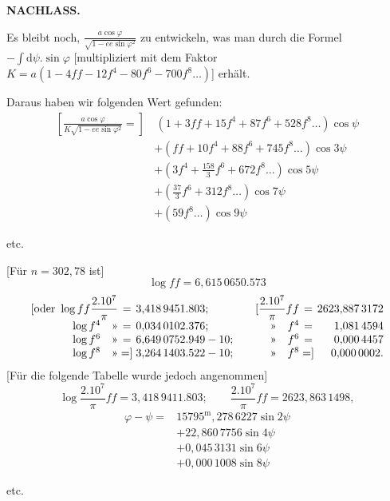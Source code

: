 \par\clearpage
{}\hfill{\small\textbf{NACHLASS.}}\hfill\null\par\medskip
Es bleibt noch, \(\frac{a\cos\varphi}{\sqrt{1-ee\sin\varphi^2}}\) zu entwickeln, was man durch die Formel \(-\int\mathrm{d}\psi.\sin\varphi\) [multipliziert mit dem Faktor \(K=a(1-4ff-12f^4-80f^6-700f^8\ldots)\)] erhält.

Daraus haben wir folgenden Wert gefunden:
\[
\begin{aligned}
\left[\frac{a\cos\varphi}{K\sqrt{1-ee\sin\varphi^2}}={}\right]
&\,(1+3ff+15f^4+87f^6+528f^8\ldots)\cos\psi\\
&+(ff+10f^4+88f^6+745f^8\ldots)\cos3\psi\\
&+\left(3f^4+\frac{158}{3}f^6+672f^8\ldots\right)\cos5\psi\\
&+\left(\frac{37}{3}f^6+312f^8\ldots\right)\cos7\psi\\
&+(59f^8\ldots)\cos9\psi
\end{aligned}
\]
{\centering etc.\par}
\bigskip
{\centering [28.]\par}
[Für \(n=302{,}78\) ist]
\[
\log ff=6{,}615\,0650.573
\]
\[
\begin{array}{@{}r@{\;}c@{\;}l@{\qquad}r@{\;}c@{\;}r@{}}
[\text{oder }\log ff\dfrac{2.10^7}{\pi}&=&3{,}418\,9451.803;&[\dfrac{2.10^7}{\pi}ff&=&2623{,}887\,3172\\[3pt]
\log f^4\quad\text{»}&=&0{,}034\,0102.376;&\text{»}\quad f^4&=&1{,}081\,4594\\
\log f^6\quad\text{»}&=&6{,}649\,0752.949-10;&\text{»}\quad f^6&=&0{,}000\,4457\\
\log f^8\quad\text{»}&=]&3{,}264\,1403.522-10;&\text{»}\quad f^8&=]&0{,}000\,0002.
\end{array}
\]
[Für die folgende Tabelle wurde jedoch angenommen]
\[
\log\frac{2.10^7}{\pi}ff=3{,}418\,9411.803;\qquad
\frac{2.10^7}{\pi}ff=2623{,}863\,1498,
\]
\noindent [dem \(n=302{,}7827\ldots\) entsprechen würde. Aufgrund dieses Werts von \(ff\) ergeben sich zwischen \(\psi,\varphi\) und \(\omega\) die folgenden Beziehungen, wenn diese Größen in Metern, also in \(10\,000\,000.\) Teilen des Quadranten gemessen werden:]
\[
\begin{aligned}
\varphi-\psi={}&15795^{\mathrm{m}}{,}278\,6227\sin2\psi\\
&+22{,}860\,7756\sin4\psi\\
&+0{,}045\,3131\sin6\psi\\
&+0{,}000\,1008\sin8\psi
\end{aligned}
\]
{\centering etc.\par}

